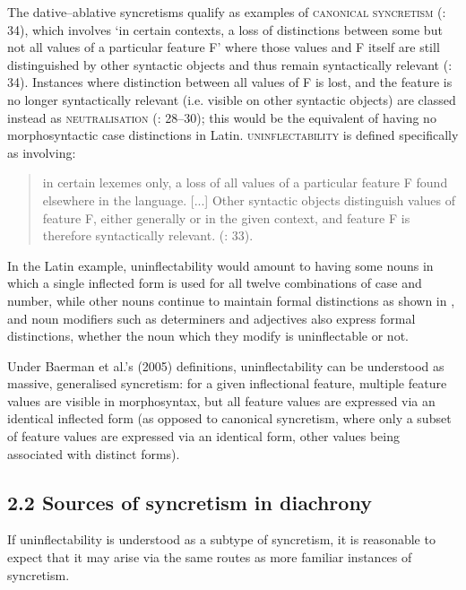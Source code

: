 \documentclass[output=paper]{langscibook}
\begin{document}
The dative–ablative syncretisms qualify as examples of \textsc{canonical} \textsc{syncretism} (\citealt{BaermanEtAl2005}: 34), which involves ‘in certain contexts, a loss of distinctions between some but not all values of a particular feature F’ where those values and F itself are still distinguished by other syntactic objects and thus remain syntactically relevant (\citealt{BaermanEtAl2005}: 34). Instances where distinction between all values of F is lost, and the feature is no longer syntactically relevant (i.e. visible on other syntactic objects) are classed instead as \textsc{neutralisation} (\citealt{BaermanEtAl2005}: 28–30); this would be the equivalent of having no morphosyntactic case distinctions in Latin. \textsc{uninflectability} is defined specifically as involving:

\begin{quote}
in certain lexemes only, a loss of all values of a particular feature F found elsewhere in the language. [...] Other syntactic objects distinguish values of feature F, either generally or in the given context, and feature F is therefore syntactically relevant. (\citealt{BaermanEtAl2005}: 33).
\end{quote}

In the Latin example, uninflectability would amount to having some nouns in which a single inflected form is used for all twelve combinations of case and number, while other nouns continue to maintain formal distinctions as shown in , and noun modifiers such as determiners and adjectives also express formal distinctions, whether the noun which they modify is uninflectable or not.

Under Baerman et al.’s (2005) definitions, uninflectability can be understood as massive, generalised syncretism: for a given inflectional feature, multiple feature values are visible in morphosyntax, but all feature values are expressed via an identical inflected form (as opposed to canonical syncretism, where only a subset of feature values are expressed via an identical form, other values being associated with distinct forms). 

\subsection{2.2  Sources of syncretism in diachrony}

If uninflectability is understood as a subtype of syncretism, it is reasonable to expect that it may arise via the same routes as more familiar instances of syncretism. 
\end{document}
